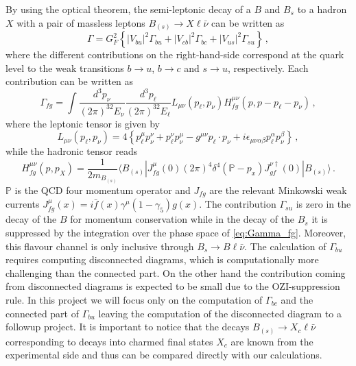 By using the optical theorem, the semi-leptonic decay of a $B$ and $B_s$
to a hadron $X$ with a pair of massless leptons $B_{(s)} \to X\ell\bar\nu$ can be written as
\begin{equation}
  \Gamma = G^2_F\left\{ |V_{bu} |^2 \Gamma_{bu} + |V_{cb} |^2 \Gamma_{bc} + |V_{us} |^2 \Gamma_{su}
  \right\}\,,
\end{equation}
where the different contributions on the right-hand-side correspond at the quark level
to the weak transitions $b \to u$, $b \to c$ and $s \to u$, respectively.
Each contribution can be written as
\begin{equation}\label{eq:Gamma_fg}
  \Gamma_{fg}=\int \frac{d^3p_\nu}{(2\pi)^32E_\nu}\frac{d^3p_\ell}{(2\pi)^32E_\ell}
  L_{\mu\nu}(p_\ell, p_\nu) H^{\mu\nu}_{fg}(p,p-p_\ell-p_\nu)\,,
\end{equation}
where the leptonic tensor is given by
\begin{equation}
  L_{\mu\nu}(p_\ell, p_\nu) =4\left\{p_\ell^\mu p_\nu^\nu +p_\ell^\nu
  p_\nu^\mu - g^{\mu\nu} p_\ell\cdot p_\nu+
  i\epsilon_{\mu\nu\alpha\beta} p_\ell^\alpha p_\nu^\beta\right\}\,,
\end{equation}
while the hadronic tensor reads
\begin{equation}
  H^{\mu\nu}_{fg}(p,p_X)=\frac{1}{2m_{B_{(s)}}}\langle B_{(s)}| J^\mu_{fg}(0)(2\pi)^4
  \delta^4(\mathbb{P}-p_x) J^{\nu\dagger}_{gf} (0)| B_{(s)}\rangle\,.
\end{equation}
$\mathbb{P}$ is the QCD four momentum operator and $J_{fg}$ are the
relevant Minkowski weak currents $J_{fg}^\mu(x)=i\bar
  f(x)\gamma^\mu(1-\gamma_5)g(x)$.
The contribution $\Gamma_{su}$ is zero in the decay of the $B$ for
momentum conservation while  in the decay of the $B_{s}$ it is
suppressed by the integration over the phase space of
\eqref{eq:Gamma_fg}. Moreover, this flavour channel is only inclusive
through $B_s\to B\ell\bar\nu$. 
The calculation of $\Gamma_{bu}$  requires computing disconnected
diagrams, which is computationally more challenging than the connected
part. 
On the other hand the contribution coming from disconnected diagrams
is expected to be small due to the OZI-suppression rule. 
In this project we will focus only on the computation of $\Gamma_{bc}$
and the connected part of $\Gamma_{bu}$ leaving the computation of the
disconnected diagram to a followup project. 
It is important to notice that the decays $B_{(s)} \to X_c\ell\bar\nu$ corresponding to decays into charmed final states $X_c$ are known from the experimental side and thus can be compared directly with our calculations.

